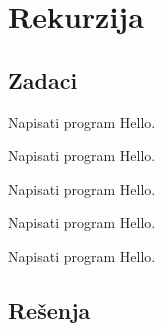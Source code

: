 
\chapter{Rekurzija}

\section{Zadaci}

\begin{Exercise}[label=101]
  Napisati program Hello.
\end{Exercise}
\begin{Answer}[ref=101]
\end{Answer}

\begin{Exercise}[label=102]
  Napisati program Hello.
\end{Exercise}
\begin{Answer}[ref=102]
\end{Answer}


\begin{Exercise}[label=103]
  Napisati program Hello.
\end{Exercise}
\begin{Answer}[ref=103]
\end{Answer}

\begin{Exercise}[label=104]
  Napisati program Hello.
\end{Exercise}
\begin{Answer}[ref=104]
\end{Answer}

\begin{Exercise}[label=105]
  Napisati program Hello.
\end{Exercise}
\begin{Answer}[ref=105]
\end{Answer}

\section{Rešenja}
\shipoutAnswer
